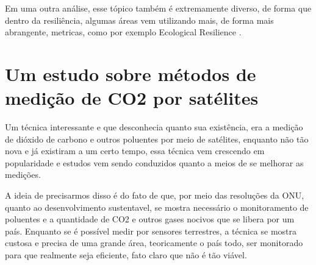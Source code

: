 \documentclass{article}[12pt]
\begin{document}
Em uma outra análise, esse tópico também é extremamente diverso, de forma que dentro da resiliência,
algumas áreas vem utilizando mais, de forma mais abrangente, metricas, como por exemplo Ecological
Resilience \cite{Cushman2019}. \par






\section{Um estudo sobre métodos de medição de CO2 por satélites}
Um técnica interessante e que desconhecia quanto sua existência, era a medição de dióxido de carbono
e outros poluentes por meio de satélites, enquanto não tão nova e já existiram a um certo tempo,
essa técnica vem crescendo em popularidade e estudos vem sendo conduzidos quanto a meios de se
melhorar as medições. \par

A ideia de precisarmos disso é do fato de que, por meio das resoluções da ONU, quanto ao
desenvolvimento sustentavel, se mostra necessário o monitoramento de poluentes e a quantidade de CO2
e outros gases nocivos que se libera por um país. Enquanto se é possível medir por sensores
terrestres, a técnica se mostra custosa e precisa de uma grande área, teoricamente o país todo, ser
monitorado para que realmente seja eficiente, fato claro que não é tão viável. \par
\end{document}
